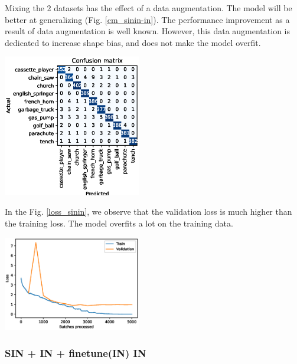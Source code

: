 \documentclass{article}
\begin{document}
Mixing the 2 datasets has the effect of a data augmentation. The model will be better
at generalizing (Fig. \ref{cm_sinin-in}). The performance improvement as a result of data augmentation 
is well known. However, this data augmentation is dedicated to increase shape bias,
and does not make the model overfit.

\begin{center}
  \captionsetup{type=figure}
  \includegraphics[width = 0.45\textwidth]{imgs/sinin/sinin-in_confusion_matrix_0.973.eps}
  \label{cm_sinin-in}
\end{center}

In the Fig. \ref{loss_sinin}, we observe that the validation loss is much higher than the training
loss. The model overfits a lot on the training data.

\begin{center}
  \captionsetup{type=figure}
  \includegraphics[width = 0.45\textwidth]{imgs/sinin/loss.eps}
  \label{loss_sinin}
\end{center}

\subsubsection{SIN + IN + finetune(IN) \texorpdfstring{\textrightarrow} .IN}
\end{document}
